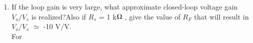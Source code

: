 \begin{enumerate}[label=\arabic*.,ref=\theenumi]
%
%
%
\renewcommand{\thefigure}{\theenumi.\arabic{figure}}
\begin{figure}[!ht]
	\begin{center}
			\resizebox{\columnwidth}{!}{}
	\end{center}
\caption{}
\label{fig:ee18btech11011_ee18btech11011_A1_circuit}
\end{figure}
%
\begin{figure}[!ht]
	\begin{center}
			\resizebox{\columnwidth}{!}{}
	\end{center}
\caption{}
\label{fig:ee18btech11011_ee18btech11011_A2_circuit}
\end{figure}
%
\renewcommand{\thefigure}{\theenumi}
%
\begin{table}[!ht]
\centering

\caption{}
\label{table:ee18btech11011_Parameters_table}
\end{table}
%
\item If the loop gain is very large, what approximate closed-loop voltage gain $V_{o}/V_{s}$ is realized?Also if $R_{s}$ = 1 k$\ohm$ , give the value of $R_{F}$ that will result in $V_{o}/V_{s}$ $\simeq$ -10 V/V.
\\
\solution For 


\end{enumerate}
